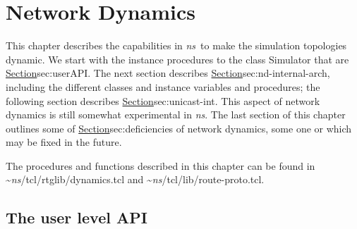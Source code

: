 \chapter{Network Dynamics}
\label{chap:net-dynamics}

This chapter describes the capabilities in \emph{ns}\
to make the simulation topologies dynamic.
We start with the instance procedures to the class Simulator
that are \href{useful to a simulation script}{Section}{sec:userAPI}.
The next section describes
\href{the internal architecture}{Section}{sec:nd-internal-arch},
including the different classes and instance variables and procedures;
the following section describes
\href{the interaction with unicast routing}{Section}{sec:unicast-int}.
This aspect of network dynamics is still somewhat experimental in \emph{ns}.
The last section of this chapter outlines some of
\href{the deficiencies in the current realization}{Section}{sec:deficiencies}
of network dynamics, some one or which
may be fixed in the future.

The procedures and functions described in this chapter can be found in
\textasciitilde\emph{ns}/{tcl/rtglib/dynamics.tcl} and \textasciitilde\emph{ns}/{tcl/lib/route-proto.tcl}.

\section{The user level API}
\label{sec:userAPI}

